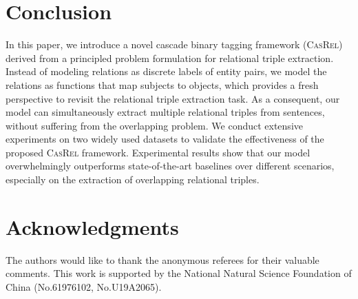 \documentclass[11pt,a4paper]{article}
\begin{document}
	\section{Conclusion}
In this paper, we introduce a novel cascade binary tagging framework (\textsc{CasRel}) derived from a principled problem formulation for relational triple extraction. Instead of modeling relations as discrete labels of entity pairs, we model the relations as functions that map subjects to objects, which provides a fresh perspective to revisit the relational triple extraction task. As a consequent, our model can simultaneously extract multiple relational triples from sentences, without suffering from the overlapping problem. We conduct extensive experiments on two widely used datasets to validate the effectiveness of the proposed \textsc{CasRel} framework. Experimental results show that our model overwhelmingly outperforms state-of-the-art baselines over different scenarios, especially on the extraction of overlapping relational triples. 	
	\section*{Acknowledgments}
	The authors would like to thank the anonymous referees for their valuable comments. This work is supported by the National Natural Science Foundation of China (No.61976102, No.U19A2065). 
	
	
	
	
	 
\end{document}

